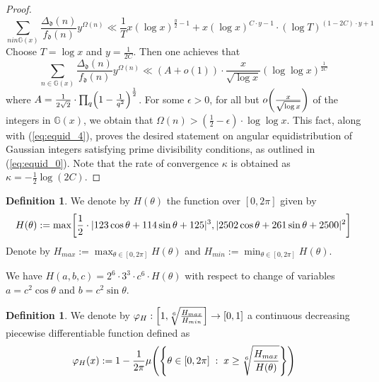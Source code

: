 \documentclass[12pt]{amsart}
\numberwithin{equation}{section} %
\theoremstyle{definition} \newtheorem{definition}[counter]{Definition}
\theoremstyle{remark} \newtheorem{nonexam}[counter]{Non-example}
\let\originalleft\left \let\originalright\right
\renewcommand{\left}{\mathopen{}\mathclose\bgroup\originalleft}
\renewcommand{\right}{\aftergroup\egroup\originalright}
\begin{document}
\begin{proof}
    \begin{equation} \label{eq:equid_4}
        \sum_{n in \mathbb{G}(x)} \frac{\Delta_\mathfrak{d}(n)}{f_\mathfrak{d}(n)}y^{\Omega(n)} \ll \frac{1}{T} x (\log x)^{\frac{y}{2} - 1} + x (\log x)^{C \cdot y - 1} \cdot (\log T)^{(1 - 2C) \cdot y + 1}
    \end{equation}
    Choose $T = \log x$ and $y = \frac{1}{2C}$. Then one achieves that
    \begin{equation}
        \sum_{n \in \mathbb{G}(x)} \frac{\Delta_\mathfrak{d}(n)}{f_\mathfrak{d}(n)}y^{\Omega(n)} \ll (A + o(1)) \cdot \frac{x}{\sqrt{\log x}} (\log \log x)^{\frac{1}{2C}}
    \end{equation}
    where $A = \frac{1}{2\sqrt{2}} \cdot \prod_{q} \left( 1 - \frac{1}{q^2} \right)^{\frac{1}{2}}$. For some $\epsilon > 0$, for all but $o \left( \frac{x}{\sqrt{\log x}} \right)$ of the integers in $\mathbb{G}(x)$, we obtain that $\Omega(n) > (\frac{1}{2} - \epsilon) \cdot \log \log x$. This fact, along with (\ref{eq:equid_4}), proves the desired statement on angular equidistribution of Gaussian integers satisfying prime divisibility conditions, as outlined in (\ref{eq:equid_0}). Note that the rate of convergence $\kappa$ is obtained as $\kappa = -\frac{1}{2}\log(2C)$.
\end{proof}

\begin{definition}
    We denote by $H(\theta)$ the function over $[0,2\pi]$ given by
    \begin{equation}
        H(\theta) := \max\left[ \frac{1}{2} \cdot |123 \cos \theta + 114 \sin \theta + 125|^3, |2502 \cos \theta + 261 \sin \theta + 2500|^2 \right]
    \end{equation}
    Denote by $H_{max} := \max_{\theta \in [0,2\pi]} H(\theta)$ and $H_{min} := \min_{\theta \in [0,2\pi]} H(\theta)$.
\end{definition}
We have $H(a,b,c) = 2^6 \cdot 3^3 \cdot c^6 \cdot H(\theta)$ with respect to change of variables $a = c^2 \cos \theta$ and $b = c^2 \sin \theta$.

\begin{definition}
    We denote by $\varphi_{H}: \left[1,\sqrt[6]{\frac{H_{max}}{H_{min}}} \right] \to [0,1]$ a continuous decreasing piecewise differentiable function defined as
    \begin{equation}
        \varphi_H(x) := 1 - \frac{1}{2\pi} \mu \left( \left\{ \theta \in [0,2\pi] \; : \; x \geq \sqrt[6]{\frac{H_{max}}{H(\theta)}} \right\} \right)
    \end{equation}
\end{definition}
\end{document}
